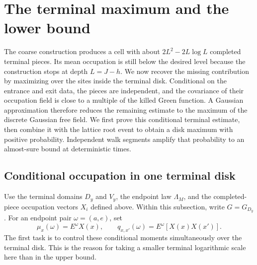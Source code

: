 \section{The terminal maximum and the lower bound}
\label{sec:terminal-lower}

The coarse construction produces a cell with about
$2L^2-2L\log L$ completed terminal pieces.  Its mean occupation is
still below the desired level because the construction stops at depth
$L=J-h$.  We now recover the missing contribution by maximizing over
the sites inside the terminal disk.  Conditional on the entrance and
exit data, the pieces are independent, and the covariance of their
occupation field is close to a multiple of the killed Green function.
A Gaussian approximation therefore reduces the remaining estimate to
the maximum of the discrete Gaussian free field.
We first prove this conditional terminal estimate, then combine it with the
lattice root event to obtain a disk maximum with positive probability.
Independent walk segments amplify that probability to an almost-sure bound
at deterministic times.

\subsection{Conditional occupation in one terminal disk}

Use the terminal domains $D_y$ and $V_y$, the endpoint law $\Lambda_M$,
and the completed-piece occupation vectors $X_i$ defined above.  Within
this subsection, write $G=G_{D_y}$.  For an endpoint pair $\omega=(a,e)$,
set
\[
 \mu_x(\omega)=E^\omega X(x),\qquad
 q_{x,x'}(\omega)=E^\omega[X(x)X(x')].
\]
The first task is to control these conditional moments simultaneously
over the terminal disk.  This is the reason for taking a smaller
terminal logarithmic scale here than in the upper bound.

